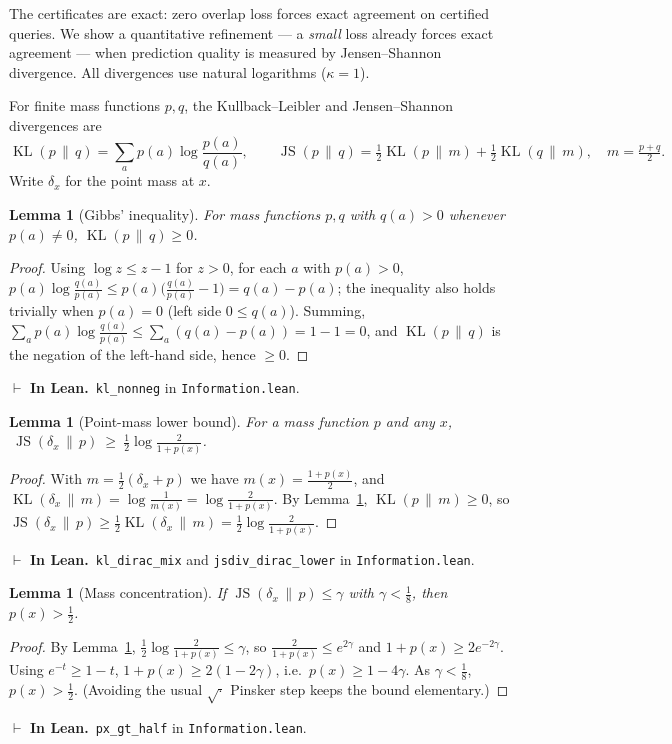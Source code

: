 \documentclass[11pt]{article}
\newcommand{\JS}{\operatorname{JS}}
\newcommand{\KL}{\operatorname{KL}}
\newcommand{\lean}[1]{\texttt{#1}}           %
\theoremstyle{plain}
\newtheorem{lemma}[theorem]{Lemma}
\theoremstyle{definition}
\newcommand{\inlean}[1]{\par\smallskip\noindent%
  {\small\textcolor{blue!50!black}{$\vdash$ \textbf{In Lean.}}~#1}\par\smallskip}
\begin{document}
The certificates are exact: zero overlap loss forces exact agreement on certified queries.
We show a quantitative refinement --- a \emph{small} loss already forces exact agreement ---
when prediction quality is measured by Jensen--Shannon divergence. All divergences use natural
logarithms ($\kappa=1$).

For finite mass functions $p,q$, the Kullback--Leibler and Jensen--Shannon divergences are
\[
  \KL(p\,\|\,q)=\sum_a p(a)\log\frac{p(a)}{q(a)},
  \qquad
  \JS(p\,\|\,q)=\tfrac12\KL(p\,\|\,m)+\tfrac12\KL(q\,\|\,m),\quad m=\tfrac{p+q}{2}.
\]
Write $\delta_x$ for the point mass at $x$.

\begin{lemma}[Gibbs' inequality]\label{lem:gibbs}
For mass functions $p,q$ with $q(a)>0$ whenever $p(a)\neq 0$, $\KL(p\,\|\,q)\ge 0$.
\end{lemma}
\begin{proof}
Using $\log z\le z-1$ for $z>0$, for each $a$ with $p(a)>0$,
$p(a)\log\frac{q(a)}{p(a)}\le p(a)\big(\frac{q(a)}{p(a)}-1\big)=q(a)-p(a)$; the inequality also
holds trivially when $p(a)=0$ (left side $0\le q(a)$). Summing,
$\sum_a p(a)\log\frac{q(a)}{p(a)}\le\sum_a(q(a)-p(a))=1-1=0$, and $\KL(p\,\|\,q)$ is the
negation of the left-hand side, hence $\ge 0$.
\end{proof}
\inlean{\lean{kl\_nonneg} in \lean{Information.lean}.}

\begin{lemma}[Point-mass lower bound]\label{lem:js-point}
For a mass function $p$ and any $x$, $\ \JS(\delta_x\,\|\,p)\ \ge\ \tfrac12\log\!\frac{2}{1+p(x)}$.
\end{lemma}
\begin{proof}
With $m=\tfrac12(\delta_x+p)$ we have $m(x)=\tfrac{1+p(x)}2$, and
$\KL(\delta_x\,\|\,m)=\log\frac1{m(x)}=\log\frac{2}{1+p(x)}$. By Lemma~\ref{lem:gibbs},
$\KL(p\,\|\,m)\ge0$, so
$\JS(\delta_x\,\|\,p)\ge\tfrac12\KL(\delta_x\,\|\,m)=\tfrac12\log\frac2{1+p(x)}$.
\end{proof}
\inlean{\lean{kl\_dirac\_mix} and \lean{jsdiv\_dirac\_lower} in \lean{Information.lean}.}

\begin{lemma}[Mass concentration]\label{lem:mass}
If $\JS(\delta_x\,\|\,p)\le\gamma$ with $\gamma<\tfrac18$, then $p(x)>\tfrac12$.
\end{lemma}
\begin{proof}
By Lemma~\ref{lem:js-point}, $\tfrac12\log\frac2{1+p(x)}\le\gamma$, so
$\frac2{1+p(x)}\le e^{2\gamma}$ and $1+p(x)\ge 2e^{-2\gamma}$. Using $e^{-t}\ge 1-t$,
$1+p(x)\ge 2(1-2\gamma)$, i.e.\ $p(x)\ge 1-4\gamma$. As $\gamma<\tfrac18$, $p(x)>\tfrac12$.
(Avoiding the usual $\sqrt{\cdot}$ Pinsker step keeps the bound elementary.)
\end{proof}
\inlean{\lean{px\_gt\_half} in \lean{Information.lean}.}
\end{document}
